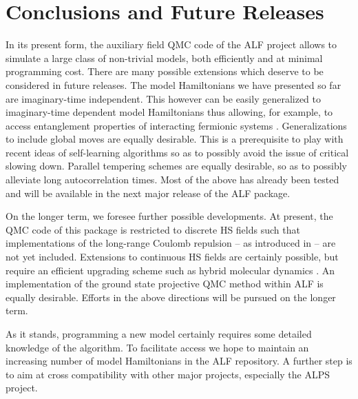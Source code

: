 \documentclass{SciPost}
\begin{document}
\section{Conclusions and Future Releases}\label{sec:con}
%
In its present form, the  auxiliary field QMC code of the ALF project  allows to simulate a large class of non-trivial models, both efficiently and at minimal  programming cost.  There are many possible extensions which deserve to be considered in future releases.    The model Hamiltonians we have presented so far are imaginary-time independent. This however can be easily generalized  to imaginary-time dependent model Hamiltonians thus allowing, for example, to access  entanglement properties of interacting fermionic systems \cite{Broecker14,Assaad14,Assaad13a,Assaad15}. Generalizations to include global moves are equally desirable. This is a prerequisite to  play with recent ideas of self-learning algorithms  \cite{Xu16a} so as to  possibly avoid the issue of critical slowing down.  Parallel tempering schemes are equally desirable, so as to possibly alleviate   long autocorrelation times.     Most of the above has already been tested  and will  be available in the next  major release of the ALF package.

On the longer term, we foresee further possible developments.  At present, the QMC code of this package is  restricted to discrete HS fields such that  implementations  of  the long-range Coulomb repulsion -- as introduced in \cite{Hohenadler14,Ulybyshev2013,Brower12} -- are not yet included.   Extensions  to  continuous HS fields are certainly possible, but require an efficient upgrading scheme such as hybrid  molecular dynamics \cite{Duane85}.    An  implementation of the  ground state projective QMC method  within ALF is equally desirable.  Efforts in  the above directions will be pursued on the longer term.  

As it stands, programming a new model  certainly requires some  detailed knowledge of the  algorithm. To facilitate access we hope  to maintain an increasing number of  model Hamiltonians in  the ALF  repository.    A further  step is to aim at  cross compatibility with other  major projects, especially the ALPS \cite{ALPS_2.0} project.
%
\end{document}
